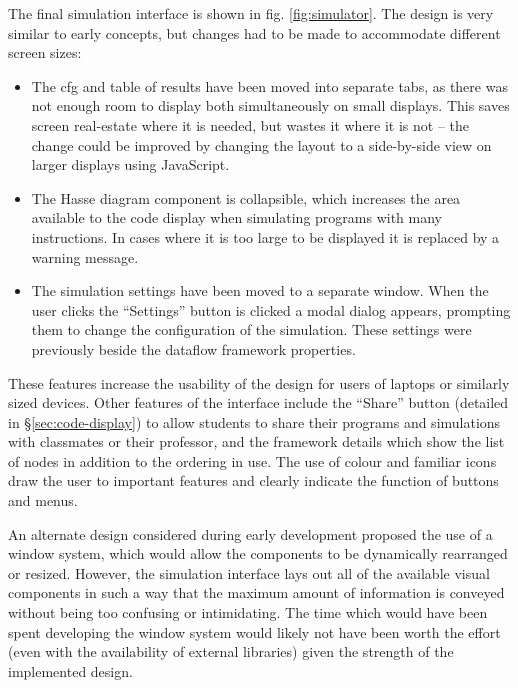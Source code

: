 \documentclass[bsc,twoside,singlespacing,parskip,logo,notimes,normalheadings]{infthesis}
\begin{document}

        The final simulation interface is shown in
        fig. \ref{fig:simulator}. The design is very similar to early
        concepts, but changes had to be made to accommodate different
        screen sizes:
        
        \begin{itemize}
        \item The \gls{cfg} and table of results have been moved into
          separate tabs, as there was not enough room to display both
          simultaneously on small displays. This saves screen
          real-estate where it is needed, but wastes it where it is
          not -- the change could be improved by changing the layout
          to a side-by-side view on larger displays using JavaScript.
        \item The Hasse diagram component is collapsible, which
          increases the area available to the code display when
          simulating programs with many instructions. In cases where
          it is too large to be displayed it is replaced by a warning
          message.
        \item The simulation settings have been moved to a separate
          window. When the user clicks the ``Settings'' button is
          clicked a modal dialog appears, prompting them to change the
          configuration of the simulation. These settings were
          previously beside the \gls{dataflow} framework properties.
        \end{itemize}

        These features increase the usability of the design for users
        of laptops or similarly sized devices. Other features of the
        interface include the ``Share'' button (detailed in
        \S\ref{sec:code-display}) to allow students to share their
        programs and simulations with classmates or their professor,
        and the framework details which show the list of nodes in
        addition to the ordering in use. The use of colour and
        familiar icons draw the user to important features and clearly
        indicate the function of buttons and menus.

        An alternate design considered during early development
        proposed the use of a window system, which would allow the
        components to be dynamically rearranged or resized. However,
        the simulation interface lays out all of the available visual
        components in such a way that the maximum amount of
        information is conveyed without being too confusing or
        intimidating. The time which would have been spent developing
        the window system would likely not have been worth the effort
        (even with the availability of external libraries) given the
        strength of the implemented design.
\end{document}

